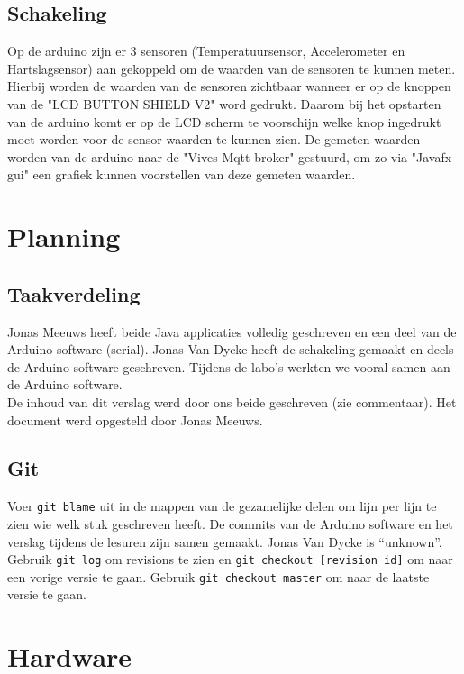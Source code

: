 \documentclass[a4paper]{report}
\newcommand{\code}[1]{\colorbox{light-gray}{\texttt{#1}}}
\begin{document}
    \section{Schakeling}
        Op de arduino zijn er 3 sensoren (Temperatuursensor, Accelerometer en Hartslagsensor) aan gekoppeld om de waarden van de sensoren te kunnen meten.
        Hierbij worden de waarden van de sensoren zichtbaar wanneer er op de knoppen van de "LCD BUTTON SHIELD V2" word gedrukt.
        Daarom bij het opstarten van de arduino komt er op de LCD scherm te voorschijn welke knop ingedrukt moet worden voor de sensor waarden te kunnen zien.
        De gemeten waarden worden van de arduino naar de "Vives Mqtt broker" gestuurd, om zo via "Javafx gui" een grafiek kunnen voorstellen van deze gemeten waarden.
    
\chapter{Planning}
    \section{Taakverdeling}
        Jonas Meeuws heeft beide Java applicaties volledig geschreven en een deel van de Arduino software (serial).
        Jonas Van Dycke heeft de schakeling gemaakt en deels de Arduino software geschreven.
        Tijdens de labo's werkten we vooral samen aan de Arduino software.\\
        De inhoud van dit verslag werd door ons beide geschreven (zie commentaar).
        Het document werd opgesteld door Jonas Meeuws.
        
    \section{Git}
        Voer \code{git blame} uit in de mappen van de gezamelijke delen om lijn per lijn te zien wie welk stuk geschreven heeft.
        De commits van de Arduino software en het verslag tijdens de lesuren zijn samen gemaakt.
        Jonas Van Dycke is ``unknown''.
        Gebruik \code{git log} om revisions te zien en \code{git checkout [revision id]} om naar een vorige versie te gaan.
        Gebruik \code{git checkout master} om naar de laatste versie te gaan.
        
\chapter{Hardware}
\end{document}
